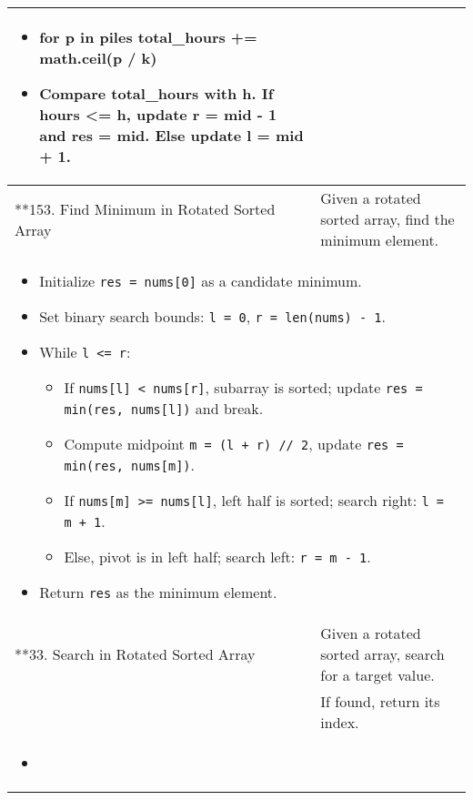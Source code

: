 \begin{summary}
\begin{center}
\begin{tabular}{ll}
{\begin{itemize}
                    \begin{itemize}
                        \item for p in piles total\_hours += math.ceil(p / k)
                        \item Compare total\_hours with h. If hours <= h, update r = mid - 1 and res = mid. Else update l = mid + 1.
                    \end{itemize}
                \end{itemize}
            } \\
            \midrule 
            **153. Find Minimum in Rotated Sorted Array & Given a rotated sorted array, find the minimum element. \\
            \multicolumn{2}{p{\linewidth}}{
                \begin{itemize}
                    \item Initialize \texttt{res = nums[0]} as a candidate minimum.
                    \item Set binary search bounds: \texttt{l = 0}, \texttt{r = len(nums) - 1}.
                    \item While \texttt{l <= r}:
                    \begin{itemize}
                        \item If \texttt{nums[l] < nums[r]}, subarray is sorted; update \texttt{res = min(res, nums[l])} and break.
                        \item Compute midpoint \texttt{m = (l + r) // 2}, update \texttt{res = min(res, nums[m])}.
                        \item If \texttt{nums[m] >= nums[l]}, left half is sorted; search right: \texttt{l = m + 1}.
                        \item Else, pivot is in left half; search left: \texttt{r = m - 1}.
                    \end{itemize}
                    \item Return \texttt{res} as the minimum element.
                \end{itemize}                
            } \\
            \midrule
            **33. Search in Rotated Sorted Array & Given a rotated sorted array, search for a target value. \\
            & If found, return its index. \\
            \multicolumn{2}{p{\linewidth}}{
                \begin{itemize}
                    \item 
                \end{itemize}
            } \\
            \midrule
            \bottomrule
        \end{tabular}
    \end{center}
\end{summary}
